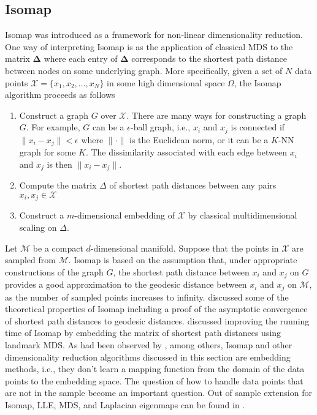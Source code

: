 \subsection{Isomap}
\label{sec:isomap}
Isomap \citep{tenebaum00:_global_geomet_framew_nonlin_dimen_reduc} was
introduced as a framework for non-linear dimensionality reduction. One
way of interpreting Isomap is as the application of classical MDS to
the matrix $\bm{\Delta}$ where each entry of $\bm{\Delta}$ corresponds
to the shortest path distance between nodes on some underlying
graph. More specifically, given a set of $N$ data points $\mathcal{X}
= \{x_1, x_2, \dots, x_N\}$ in some high dimensional space $\Omega$,
the Isomap algorithm proceeds as follows
\begin{enumerate}
\item Construct a graph $G$ over $\mathcal{X}$. There are many ways
  for constructing a graph $G$. For example, $G$ can be a
  $\epsilon$-ball graph, i.e., $x_i$ and $x_j$ is connected if $\|x_i
  - x_j\| < \epsilon$ where $\| \cdot \|$ is the Euclidean norm, or it
  can be a $K$-NN graph for some $K$. The dissimilarity associated
  with each edge between $x_i$ and $x_j$ is then $\|x_i - x_j \|$.
\item Compute the matrix $\Delta$ of shortest path distances between
  any pairs $x_i, x_j \in \mathcal{X}$
\item Construct a $m$-dimensional embedding of $\mathcal{X}$ by
  classical multidimensional scaling on $\Delta$.  
\end{enumerate}
Let $\mathcal{M}$ be a compact $d$-dimensional manifold. Suppose that
the points in $\mathcal{X}$ are sampled from $\mathcal{M}$. Isomap is
based on the assumption that, under appropriate constructions of the
graph $G$, the shortest path distance between $x_i$ and $x_j$ on $G$
provides a good approximation to the geodesic distance between $x_i$
and $x_j$ on $\mathcal{M}$, as the number of sampled points increases
to infinity. \citet{bernstein00:_graph} discussed some of the
theoretical properties of Isomap including a proof of the asymptotic
convergence of shortest path distances to geodesic
distances. \citet{silva02:_global} discussed improving the running
time of Isomap by embedding the matrix of shortest path distances
using landmark MDS. As had been observed by \citet{brand05:_chart},
among others, Isomap and other dimensionality reduction algorithms
discussed in this section are embedding methods, i.e., they don't
learn a mapping function from the domain of the data points to the
embedding space. The question of how to handle data points that are
not in the sample become an important question. Out of sample extension for
Isomap, LLE, MDS, and Laplacian eigenmaps can be found in
\citet{bengio04:_out_lle_isomap_mds_eigen,trosset08}. 
%
%
